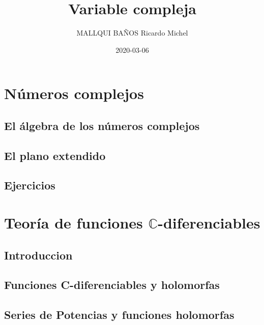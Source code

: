 \documentclass[]{book}
\title{Variable compleja}
\author{MALLQUI BAÑOS Ricardo Michel}
\date{2020-03-06}
\begin{document}
\maketitle

{
\setcounter{tocdepth}{1}
\tableofcontents
}
\hypertarget{nuxfameros-complejos}{%
\chapter{Números complejos}\label{nuxfameros-complejos}}

\hypertarget{el-uxe1lgebra-de-los-nuxfameros-complejos}{%
\section{El álgebra de los números complejos}\label{el-uxe1lgebra-de-los-nuxfameros-complejos}}

\hypertarget{el-plano-extendido}{%
\section{El plano extendido}\label{el-plano-extendido}}

\hypertarget{ejercicios}{%
\section{Ejercicios}\label{ejercicios}}

\hypertarget{teoruxeda-de-funciones-mathbbc-diferenciables}{%
\chapter{\texorpdfstring{Teoría de funciones \(\mathbb{C}\)-diferenciables}{Teoría de funciones \textbackslash{}mathbb\{C\}-diferenciables}}\label{teoruxeda-de-funciones-mathbbc-diferenciables}}

\hypertarget{introduccion}{%
\section{Introduccion}\label{introduccion}}

\hypertarget{funciones-c-diferenciables-y-holomorfas}{%
\section{Funciones C-diferenciables y holomorfas}\label{funciones-c-diferenciables-y-holomorfas}}

\hypertarget{series-de-potencias-y-funciones-holomorfas}{%
\section{Series de Potencias y funciones holomorfas}\label{series-de-potencias-y-funciones-holomorfas}}
\end{document}
